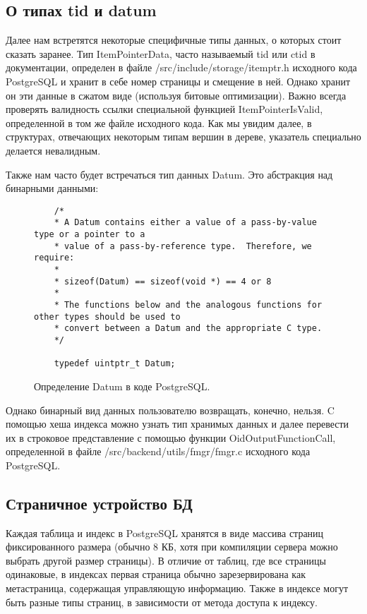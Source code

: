 \documentclass[12pt,oneside]{amsart}
\begin{document}
\subsection{О типах tid и datum}

Далее нам встретятся некоторые специфичные типы данных, о которых стоит сказать заранее. Тип ItemPointerData, часто называемый tid или ctid в документации, определен в файле /src/include/storage/itemptr.h исходного кода PostgreSQL и хранит в себе номер страницы и смещение в ней. Однако хранит он эти данные в сжатом виде (используя битовые оптимизации). Важно всегда проверять валидность ссылки специальной функцией ItemPointerIsValid, определенной в том же файле исходного кода. Как мы увидим далее, в структурах, отвечающих некоторым типам вершин в дереве, указатель специально делается невалидным.

Также нам часто будет встречаться тип данных Datum. Это абстракция над бинарными данными:

\begin{figure}[ht!]
\begin{lstlisting}
	/*
	* A Datum contains either a value of a pass-by-value type or a pointer to a
	* value of a pass-by-reference type.  Therefore, we require:
	*
	* sizeof(Datum) == sizeof(void *) == 4 or 8
	*
	* The functions below and the analogous functions for other types should be used to
	* convert between a Datum and the appropriate C type.
	*/

	typedef uintptr_t Datum;
\end{lstlisting}
\caption{Определение Datum в коде PostgreSQL.}\label{spDatum}
\end{figure}

Однако бинарный вид данных пользователю возвращать, конечно, нельзя. C помощью хеша индекса можно узнать тип хранимых данных и далее перевести их в строковое представление с помощью функции OidOutputFunctionCall, определенной в файле /src/backend/utils/fmgr/fmgr.c исходного кода PostgreSQL.


\subsection{Страничное устройство БД}

Каждая таблица и индекс в PostgreSQL хранятся в виде массива страниц фиксированного размера (обычно 8 КБ, хотя при компиляции сервера можно выбрать другой размер страницы). В отличие от таблиц, где все страницы одинаковые, в индексах первая страница обычно зарезервирована как метастраница, содержащая управляющую информацию. Также в индексе могут быть разные типы страниц, в зависимости от метода доступа к индексу.
\end{document}
